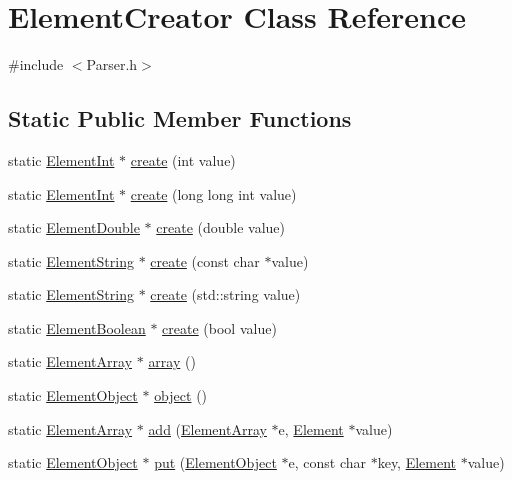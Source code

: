 \hypertarget{classElementCreator}{}\section{Element\+Creator Class Reference}
\label{classElementCreator}


{\ttfamily \#include $<$Parser.\+h$>$}

\subsection*{Static Public Member Functions}
\begin{DoxyCompactItemize}
\item 
static \mbox{\hyperlink{classElementInt}{Element\+Int}} $\ast$ \mbox{\hyperlink{classElementCreator_a4d2ee7d169ec568eb76e41dc0baaf314}{create}} (int value)
\item 
static \mbox{\hyperlink{classElementInt}{Element\+Int}} $\ast$ \mbox{\hyperlink{classElementCreator_ab7938321c7e51a63747c94b283ff2978}{create}} (long long int value)
\item 
static \mbox{\hyperlink{classElementDouble}{Element\+Double}} $\ast$ \mbox{\hyperlink{classElementCreator_a4654c6b5d2431bde10d9652146ad43a1}{create}} (double value)
\item 
static \mbox{\hyperlink{classElementString}{Element\+String}} $\ast$ \mbox{\hyperlink{classElementCreator_a85bfd97a051e5ae5a790b919aa28fee2}{create}} (const char $\ast$value)
\item 
static \mbox{\hyperlink{classElementString}{Element\+String}} $\ast$ \mbox{\hyperlink{classElementCreator_ab1342c3ed8561bf9ad762c7446a3f4e8}{create}} (std\+::string value)
\item 
static \mbox{\hyperlink{classElementBoolean}{Element\+Boolean}} $\ast$ \mbox{\hyperlink{classElementCreator_aca695a65aa4ef18a480ed380d07e7adf}{create}} (bool value)
\item 
static \mbox{\hyperlink{classElementArray}{Element\+Array}} $\ast$ \mbox{\hyperlink{classElementCreator_a997d880e54dc5282f795c741117088c7}{array}} ()
\item 
static \mbox{\hyperlink{classElementObject}{Element\+Object}} $\ast$ \mbox{\hyperlink{classElementCreator_a9ecb3456bf27d6f9b3c9f5f8130cfe63}{object}} ()
\item 
static \mbox{\hyperlink{classElementArray}{Element\+Array}} $\ast$ \mbox{\hyperlink{classElementCreator_a2e31122026b0cbc70196b5c299c33816}{add}} (\mbox{\hyperlink{classElementArray}{Element\+Array}} $\ast$e, \mbox{\hyperlink{classElement}{Element}} $\ast$value)
\item 
static \mbox{\hyperlink{classElementObject}{Element\+Object}} $\ast$ \mbox{\hyperlink{classElementCreator_a741ad4af271f1dcc1a113d2f49189bb4}{put}} (\mbox{\hyperlink{classElementObject}{Element\+Object}} $\ast$e, const char $\ast$key, \mbox{\hyperlink{classElement}{Element}} $\ast$value)
\end{DoxyCompactItemize}


